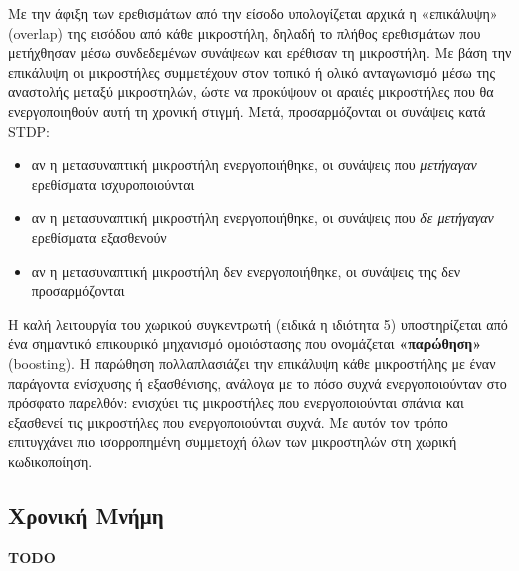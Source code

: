 Με την άφιξη των ερεθισμάτων από την είσοδο υπολογίζεται αρχικά η «επικάλυψη» (overlap) της εισόδου από κάθε μικροστήλη,
δηλαδή το πλήθος ερεθισμάτων που μετήχθησαν μέσω συνδεδεμένων συνάψεων και ερέθισαν τη μικροστήλη.
Με βάση την επικάλυψη οι μικροστήλες συμμετέχουν στον τοπικό ή ολικό ανταγωνισμό μέσω της αναστολής μεταξύ μικροστηλών,
ώστε να προκύψουν οι αραιές μικροστήλες που θα ενεργοποιηθούν αυτή τη χρονική στιγμή.
Μετά, προσαρμόζονται οι συνάψεις κατά STDP:
\begin{itemize}
	\item αν η μετασυναπτική μικροστήλη ενεργοποιήθηκε, οι συνάψεις που \textit{μετήγαγαν} ερεθίσματα ισχυροποιούνται
	\item αν η μετασυναπτική μικροστήλη ενεργοποιήθηκε, οι συνάψεις που \textit{δε μετήγαγαν} ερεθίσματα εξασθενούν
	\item αν η μετασυναπτική μικροστήλη δεν ενεργοποιήθηκε, οι συνάψεις της δεν προσαρμόζονται
\end{itemize}

Η καλή λειτουργία του χωρικού συγκεντρωτή (ειδικά η ιδιότητα 5) υποστηρίζεται από ένα σημαντικό επικουρικό μηχανισμό ομοιόστασης που ονομάζεται \textbf{«παρώθηση»} (boosting).
Η παρώθηση πολλαπλασιάζει την επικάλυψη κάθε μικροστήλης με έναν παράγοντα ενίσχυσης ή εξασθένισης, ανάλογα με το πόσο συχνά ενεργοποιούνταν στο πρόσφατο παρελθόν:
ενισχύει τις μικροστήλες που ενεργοποιούνται σπάνια και εξασθενεί τις μικροστήλες που ενεργοποιούνται συχνά.
Με αυτόν τον τρόπο επιτυγχάνει πιο ισορροπημένη συμμετοχή όλων των μικροστηλών στη χωρική κωδικοποίηση.

\subsection{Χρονική Μνήμη}

{\large \textbf{TODO}}

